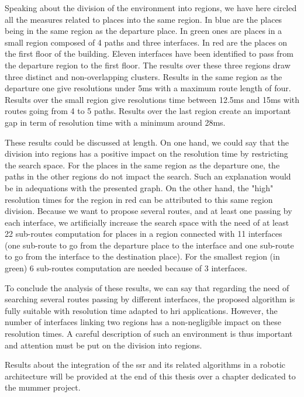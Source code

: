 Speaking about the division of the environment into regions, we have here circled all the measures related to places into the same region. In blue are the places being in the same region as the departure place. In green ones are places in a small region composed of 4 paths and three interfaces. In red are the places on the first floor of the building. Eleven interfaces have been identified to pass from the departure region to the first floor. The results over these three regions draw three distinct and non-overlapping clusters. Results in the same region as the departure one give resolutions under 5ms with a maximum route length of four. Results over the small region give resolutions time between 12.5ms and 15ms with routes going from 4 to 5 paths. Results over the last region create an important gap in term of resolution time with a minimum around 28ms. 

These results could be discussed at length. On one hand, we could say that the division into regions has a positive impact on the resolution time by restricting the search space. For the places in the same region as the departure one, the paths in the other regions do not impact the search. Such an explanation would be in adequations with the presented graph. On the other hand, the "high" resolution times for the region in red can be attributed to this same region division. Because we want to propose several routes, and at least one passing by each interface, we artificially increase the search space with the need of at least 22 sub-routes computation for places in a region connected with 11 interfaces (one sub-route to go from the departure place to the interface and one sub-route to go from the interface to the destination place). For the smallest region (in green) 6 sub-routes computation are needed because of 3 interfaces.

To conclude the analysis of these results, we can say that regarding the need of searching several routes passing by different interfaces, the proposed algorithm is fully suitable with resolution time adapted to \acrshort{hri} applications. However, the number of interfaces linking two regions has a non-negligible impact on these resolution times. A careful description of such an environment is thus important and attention must be put on the division into regions.  

Results about the integration of the \acrshort{ssr} and its related algorithms in a robotic architecture will be provided at the end of this thesis over a chapter dedicated to the \acrshort{mummer} project.
